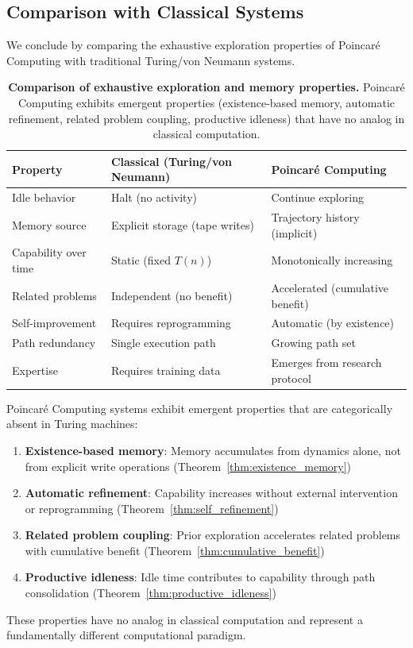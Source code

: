 \subsection{Comparison with Classical Systems}

We conclude by comparing the exhaustive exploration properties of Poincaré Computing with traditional Turing/von Neumann systems.

\begin{table}[ht]
\centering
\begin{tabular}{lll}
\toprule
\textbf{Property} & \textbf{Classical (Turing/von Neumann)} & \textbf{Poincaré Computing} \\
\midrule
Idle behavior & Halt (no activity) & Continue exploring \\
Memory source & Explicit storage (tape writes) & Trajectory history (implicit) \\
Capability over time & Static (fixed $T(n)$) & Monotonically increasing \\
Related problems & Independent (no benefit) & Accelerated (cumulative benefit) \\
Self-improvement & Requires reprogramming & Automatic (by existence) \\
Path redundancy & Single execution path & Growing path set \\
Expertise & Requires training data & Emerges from research protocol \\
\bottomrule
\end{tabular}
\caption{\textbf{Comparison of exhaustive exploration and memory properties.} Poincaré Computing exhibits emergent properties (existence-based memory, automatic refinement, related problem coupling, productive idleness) that have no analog in classical computation.}
\label{tab:exhaustive_comparison}
\end{table}

\begin{theorem}
\label{thm:fundamental_distinction}
Poincaré Computing systems exhibit emergent properties that are categorically absent in Turing machines:
\begin{enumerate}
    \item \textbf{Existence-based memory}: Memory accumulates from dynamics alone, not from explicit write operations (Theorem~\ref{thm:existence_memory})
    
    \item \textbf{Automatic refinement}: Capability increases without external intervention or reprogramming (Theorem~\ref{thm:self_refinement})
    
    \item \textbf{Related problem coupling}: Prior exploration accelerates related problems with cumulative benefit (Theorem~\ref{thm:cumulative_benefit})
    
    \item \textbf{Productive idleness}: Idle time contributes to capability through path consolidation (Theorem~\ref{thm:productive_idleness})
\end{enumerate}
These properties have no analog in classical computation and represent a fundamentally different computational paradigm.
\end{theorem}

